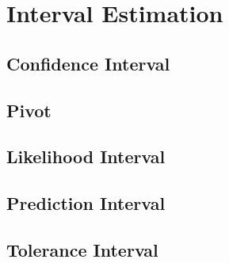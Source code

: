 
\chapter{Interval Estimation}

\section{Confidence Interval}

\section{Pivot}

\section{Likelihood Interval}

\section{Prediction Interval}

\section{Tolerance Interval}
